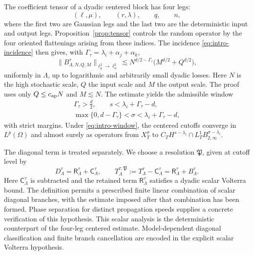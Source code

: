\documentclass[11pt,reqno]{amsart}
\numberwithin{equation}{section}
\theoremstyle{plain}
\theoremstyle{definition}
\newcommand{\Ret}{\mathsf R}
\newcommand{\Ctr}{\mathsf C}
\begin{document}
The coefficient tensor of a dyadic centered block has four legs:
\[
        (\ell,\mu),\qquad (r,\lambda),\qquad q,\qquad n,
\]
where the first two are Gaussian legs and the last two are the deterministic
input and output legs.  Proposition~\ref{prop:tensor} controls the random
operator by the four oriented flattenings arising from these indices.  The
incidence \eqref{eq:intro-incidence} then gives, with
\(\Gamma_\tau=\lambda_i+\alpha_j+\alpha_k\),
\begin{equation}\label{eq:intro-profile}
        \|B_{\Lambda,N,Q,M}^{\tau}\|_{\ell_q^2\to\ell_n^2}
        \lesssim
        N^{d/2-\Gamma_\tau}\bigl(M^{d/2}+Q^{d/2}\bigr),
\end{equation}
uniformly in \(\Lambda\), up to logarithmic and arbitrarily small dyadic
losses.  Here \(N\) is the high stochastic scale, \(Q\) the input scale and
\(M\) the output scale.  The proof uses only \(Q\le c_{\rm ap}N\) and
\(M\lesssim N\).  The estimate yields
the admissible window
\begin{equation}\label{eq:intro-window}
\begin{gathered}
        \Gamma_\tau>\frac d2,\qquad
        s<\lambda_i+\Gamma_\tau-d,\\
        \max\{0,d-\Gamma_\tau\}<\sigma
        <\lambda_i+\Gamma_\tau-d,
\end{gathered}
\end{equation}
with strict margins.  Under \eqref{eq:intro-window}, the centered cutoffs
converge in \(L^p(\Omega)\) and almost surely as operators from
\(X_T^\sigma\) to
\(C_TH^{s-\lambda_i}\cap L_T^1B^{\sigma-\lambda_i}_{2,\infty}\).

The diagonal term is treated separately.  We choose a resolution
\(\mathfrak P\), given at cutoff level by
\begin{equation}\label{eq:intro-resolution}
        D^\tau_\Lambda=\Ret^\tau_\Lambda+\Ctr^\tau_\Lambda,
        \qquad
        T^{\tau,\mathfrak P}_\Lambda
        :=T^\tau_\Lambda-\Ctr^\tau_\Lambda
        =\Ret^\tau_\Lambda+B^\tau_\Lambda .
\end{equation}
Here \(\Ctr^\tau_\Lambda\) is subtracted and the retained term
\(\Ret^\tau_\Lambda\) satisfies a dyadic scalar Volterra bound.  The
definition permits a prescribed finite linear combination of scalar
diagonal branches, with the estimate imposed after that combination has
been formed.  Phase separation for distinct propagation speeds supplies a
concrete verification of this hypothesis.  This scalar analysis is the
deterministic counterpart of the four-leg centered estimate.  Model-dependent
diagonal classification and finite branch cancellation are encoded in the
explicit scalar Volterra hypothesis.
\end{document}
